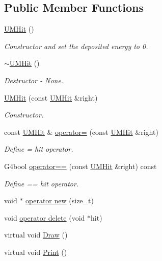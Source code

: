 \subsection*{Public Member Functions}
\begin{DoxyCompactItemize}
\item 
\hyperlink{classUMHit_a394e817a3a89fab49c06d00fda476050}{U\+M\+Hit} ()
\begin{DoxyCompactList}\small\item\em Constructor and set the deposited energy to 0. \end{DoxyCompactList}\item 
\hyperlink{classUMHit_a1baa8f810beaa912147438a9551b59e8}{$\sim$\+U\+M\+Hit} ()
\begin{DoxyCompactList}\small\item\em Destructor -\/ None. \end{DoxyCompactList}\item 
\hyperlink{classUMHit_aca5680bf533cac7ff218317ddbdac93b}{U\+M\+Hit} (const \hyperlink{classUMHit}{U\+M\+Hit} \&right)
\begin{DoxyCompactList}\small\item\em Constructor. \end{DoxyCompactList}\item 
const \hyperlink{classUMHit}{U\+M\+Hit} \& \hyperlink{classUMHit_a2c5c0ca780f8089def10974f044c2111}{operator=} (const \hyperlink{classUMHit}{U\+M\+Hit} \&right)
\begin{DoxyCompactList}\small\item\em Define = hit operator. \end{DoxyCompactList}\item 
G4bool \hyperlink{classUMHit_af502a147d6cb493e5bacfde7019b1d0d}{operator==} (const \hyperlink{classUMHit}{U\+M\+Hit} \&right) const 
\begin{DoxyCompactList}\small\item\em Define == hit operator. \end{DoxyCompactList}\item 
void $\ast$ \hyperlink{classUMHit_a9ea7dddc4dd813d59f321443f653815d}{operator new} (size\+\_\+t)
\item 
void \hyperlink{classUMHit_a472a42be272e3bf0e2e01889051c0b42}{operator delete} (void $\ast$hit)
\item 
virtual void \hyperlink{classUMHit_ae0fb0c79824f713956c36d83ff8b2685}{Draw} ()
\item 
virtual void \hyperlink{classUMHit_ac06e6339f2a24ab539bb0b811bf85e8d}{Print} ()

\end{DoxyCompactItemize}
